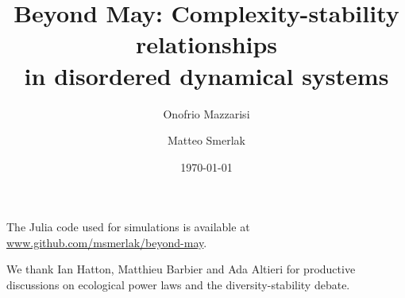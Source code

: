 \documentclass[
 prl,
 twocolumn,
 amsmath,
 amssymb,
 aps,
]{revtex4-2}
\begin{document}
\title{Beyond May: Complexity-stability relationships \\
in disordered dynamical systems}

\author{Onofrio Mazzarisi}

\author{Matteo Smerlak}


\date{\today}

\begin{abstract}

\end{abstract}
\maketitle

\paragraph*{}


\paragraph*{}


\paragraph*{}


\paragraph*{}


\paragraph*{}


\paragraph*{}


\medskip

The Julia code used for simulations is available at \url{www.github.com/msmerlak/beyond-may}.

\medskip

\begin{acknowledgments}
We thank Ian Hatton, Matthieu Barbier and Ada Altieri for productive discussions on ecological power laws and the diversity-stability debate. 
\end{acknowledgments}

\medskip



\end{document}
